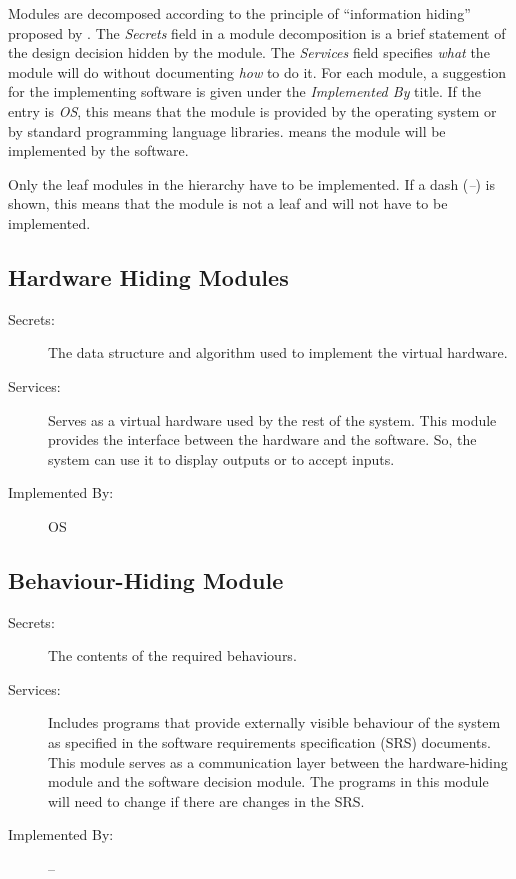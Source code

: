 \documentclass[12pt, titlepage]{article}
\begin{document}
Modules are decomposed according to the principle of ``information hiding''
proposed by \citet{ParnasEtAl1984}. The \emph{Secrets} field in a module
decomposition is a brief statement of the design decision hidden by the
module. The \emph{Services} field specifies \emph{what} the module will do
without documenting \emph{how} to do it. For each module, a suggestion for the
implementing software is given under the \emph{Implemented By} title. If the
entry is \emph{OS}, this means that the module is provided by the operating
system or by standard programming language libraries.  \emph{\progname{}} means the
module will be implemented by the \progname{} software.

Only the leaf modules in the hierarchy have to be implemented. If a dash
(\emph{--}) is shown, this means that the module is not a leaf and will not have
to be implemented.

\subsection{Hardware Hiding Modules}

\begin{description}
\item[Secrets:] The data structure and algorithm used to implement the virtual
  hardware.
\item[Services:]Serves as a virtual hardware used by the rest of the
  system. This module provides the interface between the hardware and the
  software. So, the system can use it to display outputs or to accept inputs.
\item[Implemented By:] OS
\end{description}

\subsection{Behaviour-Hiding Module}

\begin{description}
\item[Secrets:]The contents of the required behaviours.
\item[Services:]Includes programs that provide externally visible behaviour of
  the system as specified in the software requirements specification (SRS)
  documents. This module serves as a communication layer between the
  hardware-hiding module and the software decision module. The programs in this
  module will need to change if there are changes in the SRS.
\item[Implemented By:] --
\end{description}
\end{document}
